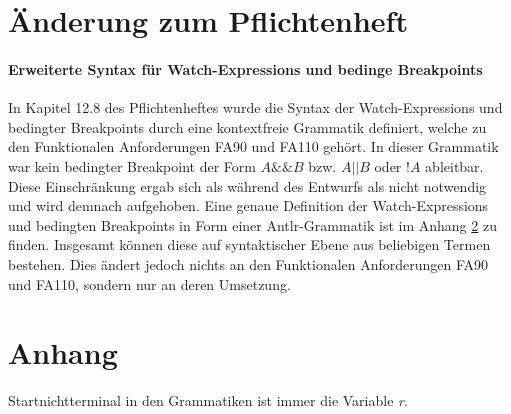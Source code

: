 \documentclass[parskip=full]{scrartcl}
\begin{document}
\newpage
\section{Änderung zum Pflichtenheft}
\paragraph{Erweiterte Syntax für Watch-Expressions und bedinge Breakpoints}
In Kapitel 12.8 des Pflichtenheftes wurde die Syntax der Watch-Expressions und bedingter Breakpoints durch eine kontextfreie Grammatik definiert, welche zu den Funktionalen Anforderungen FA90 und FA110 gehört.
In dieser Grammatik war kein bedingter Breakpoint der Form $A\&\&B$ bzw. $A||B$ oder $!A$ ableitbar. Diese Einschränkung ergab sich als während des Entwurfs als nicht notwendig und wird demnach aufgehoben. Eine genaue Definition der Watch-Expressions und bedingten Breakpoints in Form einer Antlr-Grammatik ist im Anhang \ref{Anhang} zu finden. Insgesamt können diese auf syntaktischer Ebene aus beliebigen Termen bestehen. Dies ändert jedoch nichts an den Funktionalen Anforderungen FA90 und FA110, sondern nur an deren Umsetzung.



\newpage
\section{Anhang}
\label{Anhang}

Startnichtterminal in den Grammatiken ist immer die Variable \textit{r}.
\end{document}
